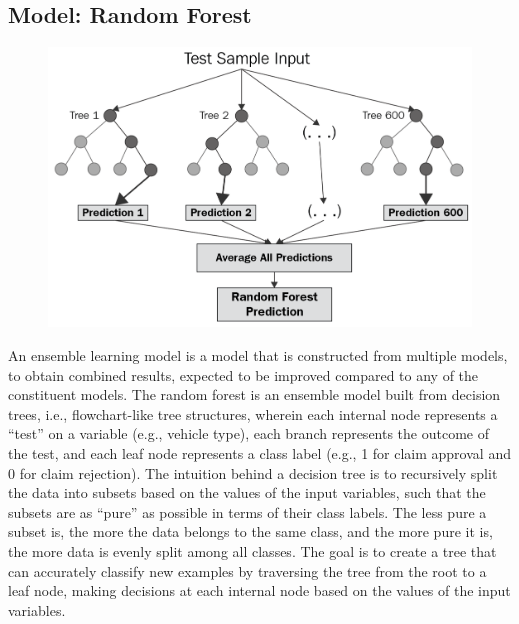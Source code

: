\documentclass{article}
\begin{document}
\hypertarget{model-random-forest}{%
\subsection{\texorpdfstring{Model: Random Forest
\label{subsec:model-rf}}{Model: Random Forest }}\label{model-random-forest}}

\begin{figure}
\includegraphics[width=0.9\linewidth]{./figures/rf-model.png}
\end{figure}

An ensemble learning model is a model that is constructed from multiple
models, to obtain combined results, expected to be improved compared to
any of the constituent models. The random forest is an ensemble model
built from decision trees, i.e., flowchart-like tree structures, wherein
each internal node represents a ``test'' on a variable (e.g., vehicle
type), each branch represents the outcome of the test, and each leaf
node represents a class label (e.g., 1 for claim approval and 0 for
claim rejection). The intuition behind a decision tree is to recursively
split the data into subsets based on the values of the input variables,
such that the subsets are as ``pure'' as possible in terms of their
class labels. The less pure a subset is, the more the data belongs to
the same class, and the more pure it is, the more data is evenly split
among all classes. The goal is to create a tree that can accurately
classify new examples by traversing the tree from the root to a leaf
node, making decisions at each internal node based on the values of the
input variables.
\end{document}
